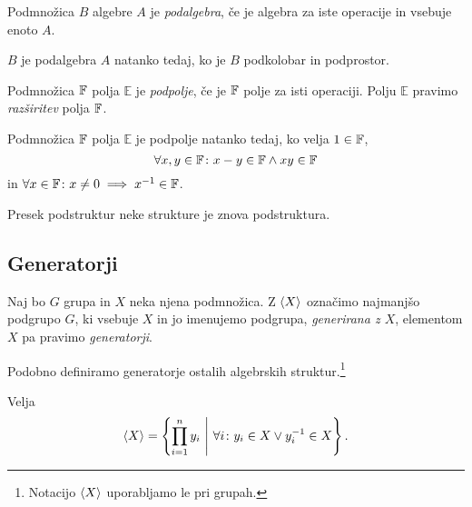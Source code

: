 \obvs

\begin{definicija}
Podmnožica $B$ algebre $A$ je \emph{podalgebra}, če je algebra za
iste operacije in vsebuje enoto $A$.
\end{definicija}

\begin{trditev}
$B$ je podalgebra $A$ natanko tedaj, ko je $B$ podkolobar in
podprostor.
\end{trditev}

\begin{definicija}
Podmnožica $\mathbb{F}$ polja $\mathbb{E}$ je \emph{podpolje}, če je $\mathbb{F}$
polje za isti operaciji. Polju $\mathbb{E}$ pravimo
\emph{razširitev} polja
$\mathbb{F}$.
\end{definicija}

\begin{trditev}
Podmnožica $\mathbb{F}$ polja $\mathbb{E}$ je podpolje natanko tedaj, ko
velja $1 \in \mathbb{F}$,
\[
\forall x,y \in \mathbb{F} \colon x-y \in \mathbb{F} \land xy \in \mathbb{F}
\]
in $\forall x \in \mathbb{F} \colon x \ne 0 \implies x^{-1} \in \mathbb{F}$.
\end{trditev}

\obvs

\begin{trditev}
Presek podstruktur neke strukture je znova podstruktura.
\end{trditev}

\newpage

\subsection{Generatorji}

\begin{definicija}
Naj bo $G$ grupa in $X$ neka njena podmnožica. Z $\left\langle X\right\rangle$ označimo
najmanjšo podgrupo $G$, ki vsebuje $X$ in jo imenujemo podgrupa,
\emph{generirana z $X$}, elementom $X$ pa pravimo
\emph{generatorji}.
\end{definicija}

\begin{opomba}
Podobno definiramo generatorje ostalih algebrskih struktur.\footnote{
Notacijo $\left\langle X\right\rangle$ uporabljamo le pri grupah.}
\end{opomba}

\begin{trditev}
Velja
\[
\left\langle X\right\rangle = \left\{\prod_{i=1}^n y_i~\middle\vert~\forall i \colon
y_i \in X \lor y_i^{-1} \in X\right\}.
\]
\end{trditev}

